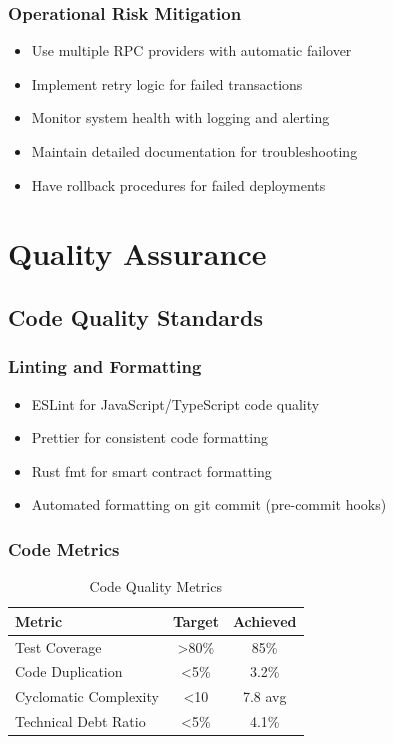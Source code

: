 \documentclass[a4paper,13pt,twoside]{report}
\theoremstyle{definition}
\begin{document}
\subsubsection{Operational Risk Mitigation}

\begin{itemize}
    \item Use multiple RPC providers with automatic failover
    \item Implement retry logic for failed transactions
    \item Monitor system health with logging and alerting
    \item Maintain detailed documentation for troubleshooting
    \item Have rollback procedures for failed deployments
\end{itemize}

\section{Quality Assurance}

\subsection{Code Quality Standards}

\subsubsection{Linting and Formatting}

\begin{itemize}
    \item ESLint for JavaScript/TypeScript code quality
    \item Prettier for consistent code formatting
    \item Rust fmt for smart contract formatting
    \item Automated formatting on git commit (pre-commit hooks)
\end{itemize}

\subsubsection{Code Metrics}

\begin{table}[h]
\centering
\caption{Code Quality Metrics}
\begin{tabular}{|l|c|c|}
\hline
\textbf{Metric} & \textbf{Target} & \textbf{Achieved} \\
\hline
Test Coverage & >80\% & 85\% \\
Code Duplication & <5\% & 3.2\% \\
Cyclomatic Complexity & <10 & 7.8 avg \\
Technical Debt Ratio & <5\% & 4.1\% \\
\hline
\end{tabular}
\end{table}
\end{document}

